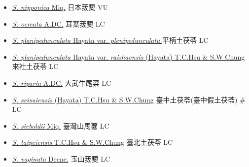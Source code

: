 \begin{itemize}
\begin{itemize}
        \item[] \href{http://www.theplantlist.org/tpl1.1/search?q=Smilax+nipponica}{\textit{S. nipponica} Miq.}   日本菝葜 VU
        \item[] \href{http://www.theplantlist.org/tpl1.1/search?q=Smilax+ocreata}{\textit{S. ocreata} A.DC.}   耳葉菝葜 LC
        \item[] \href{http://www.theplantlist.org/tpl1.1/search?q=Smilax+planipedunculata+var.+plenipedunculata}{\textit{S. planipedunculata} Hayata var. \textit{plenipedunculata} }   平柄土茯苓 LC
        \item[] \href{http://www.theplantlist.org/tpl1.1/search?q=Smilax+planipedunculata+var.+raishaensis}{\textit{S. planipedunculata} Hayata var. \textit{raishaensis} (Hayata) T.C.Hsu \& S.W.Chung}   來社土茯苓 LC
        \item[] \href{http://www.theplantlist.org/tpl1.1/search?q=Smilax+riparia}{\textit{S. riparia} A.DC.}   大武牛尾菜 LC
        \item[] \href{http://www.theplantlist.org/tpl1.1/search?q=Smilax+seisuiensis}{\textit{S. seisuiensis} (Hayata) T.C.Hsu \& S.W.Chung}     臺中土茯苓(臺中假土茯苓)  \# LC
        \item[] \href{http://www.theplantlist.org/tpl1.1/search?q=Smilax+sieboldii}{\textit{S. sieboldii} Miq.}   臺灣山馬薯 LC
        \item[] \href{http://www.theplantlist.org/tpl1.1/search?q=Smilax+taipeiensis}{\textit{S. taipeiensis} T.C.Hsu \& S.W.Chung}   臺北土茯苓 LC
        \item[] \href{http://www.theplantlist.org/tpl1.1/search?q=Smilax+vaginata}{\textit{S. vaginata} Decne.}   玉山菝葜 LC
  \end{itemize}
  \end{itemize}
